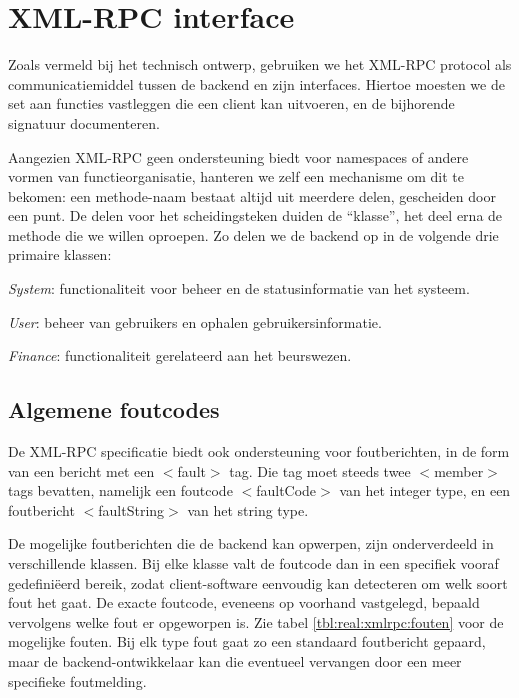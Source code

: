\section{XML-RPC interface}

Zoals vermeld bij het technisch ontwerp, gebruiken we het XML-RPC protocol als communicatiemiddel tussen de backend en zijn interfaces. Hiertoe moesten we de set aan functies vastleggen die een client kan uitvoeren, en de bijhorende signatuur documenteren.

Aangezien XML-RPC geen ondersteuning biedt voor namespaces of andere vormen van functieorganisatie, hanteren we zelf een mechanisme om dit te bekomen: een methode-naam bestaat altijd uit meerdere delen, gescheiden door een punt. De delen voor het scheidingsteken duiden de ``klasse'', het deel erna de methode die we willen oproepen.
Zo delen we de backend op in de volgende drie primaire klassen:
\begin{itemize_compact}
\item{\emph{System}: functionaliteit voor beheer en de statusinformatie van het systeem.}
\item{\emph{User}: beheer van gebruikers en ophalen gebruikersinformatie.}
\item{\emph{Finance}: functionaliteit gerelateerd aan het beurswezen.}
\end{itemize_compact}

\subsection{Algemene foutcodes}

De XML-RPC specificatie biedt ook ondersteuning voor foutberichten, in de form van een bericht met een $<$fault$>$ tag. Die tag moet steeds twee $<$member$>$ tags bevatten, namelijk een foutcode $<$faultCode$>$ van het integer type, en een foutbericht $<$faultString$>$ van het string type.

De mogelijke foutberichten die de backend kan opwerpen, zijn onderverdeeld in verschillende klassen. Bij elke klasse valt de foutcode dan in een specifiek vooraf gedefini\"eerd bereik, zodat client-software eenvoudig kan detecteren om welk soort fout het gaat. De exacte foutcode, eveneens op voorhand vastgelegd, bepaald vervolgens welke fout er opgeworpen is. Zie tabel \ref{tbl:real:xmlrpc:fouten} voor de mogelijke fouten.
Bij elk type fout gaat zo een standaard foutbericht gepaard, maar de backend-ontwikkelaar kan die eventueel vervangen door een meer specifieke foutmelding.

